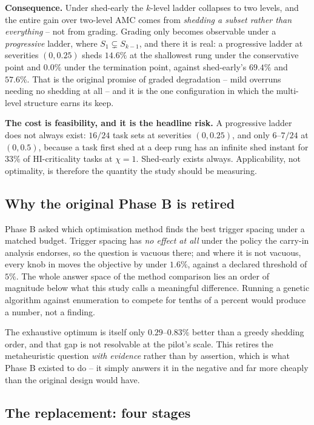 \documentclass{article}
\begin{document}
\textbf{Consequence.} Under shed-early the $k$-level ladder collapses to two
levels, and the entire gain over two-level AMC comes from \emph{shedding a
subset rather than everything} -- not from grading. Grading only becomes
observable under a \emph{progressive} ladder, where $S_1 \subsetneq S_{k-1}$,
and there it is real: a progressive ladder at severities $(0, 0.25)$ sheds
$14.6\%$ at the shallowest rung under the conservative point and $0.0\%$ under
the termination point, against shed-early's $69.4\%$ and $57.6\%$. That is the
original promise of graded degradation -- mild overruns needing no shedding at
all -- and it is the one configuration in which the multi-level structure earns
its keep.

\textbf{The cost is feasibility, and it is the headline risk.} A progressive
ladder does not always exist: $16/24$ task sets at severities $(0, 0.25)$, and
only $6$--$7/24$ at $(0, 0.5)$, because a task first shed at a deep rung has an
infinite shed instant for $33\%$ of HI-criticality tasks at $\chi = 1$. Shed-early
exists always. Applicability, not optimality, is therefore the quantity the
study should be measuring.

\subsection{Why the original Phase B is retired}

Phase B asked which optimisation method finds the best trigger spacing under a
matched budget. Trigger spacing has \emph{no effect at all} under the policy the
carry-in analysis endorses, so the question is vacuous there; and where it is
not vacuous, every knob in  moves the objective by under
$1.6\%$, against a declared threshold of $5\%$. The whole answer space of the
method comparison lies an order of magnitude below what this study calls a
meaningful difference. Running a genetic algorithm against enumeration to
compete for tenths of a percent would produce a number, not a finding.

The exhaustive optimum is itself only $0.29$--$0.83\%$ better than a greedy
shedding order, and that gap is not resolvable at the pilot's scale. This
retires the metaheuristic question \emph{with evidence} rather than by
assertion, which is what Phase B existed to do -- it simply answers it in the
negative and far more cheaply than the original design would have.

\subsection{The replacement: four stages}
\end{document}
